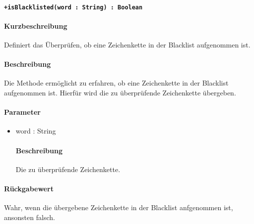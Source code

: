 \paragraph*{\texttt{+isBlacklisted(word : String) : Boolean}}%
\paragraph*{Kurzbeschreibung}
Definiert das Überprüfen, ob eine Zeichenkette in der Blacklist aufgenommen ist.
\paragraph*{Beschreibung}
Die Methode ermöglicht zu erfahren, ob eine Zeichenkette in der Blacklist aufgenommen ist.
Hierfür wird die zu überprüfende Zeichenkette übergeben.
\paragraph*{Parameter}
\begin{itemize}
    \item word : String
    		\paragraph*{Beschreibung}
    		Die zu überprüfende Zeichenkette.
\end{itemize}
\paragraph*{Rückgabewert}
Wahr, wenn die übergebene Zeichenkette in der Blacklist anfgenommen ist, ansonsten falsch.
